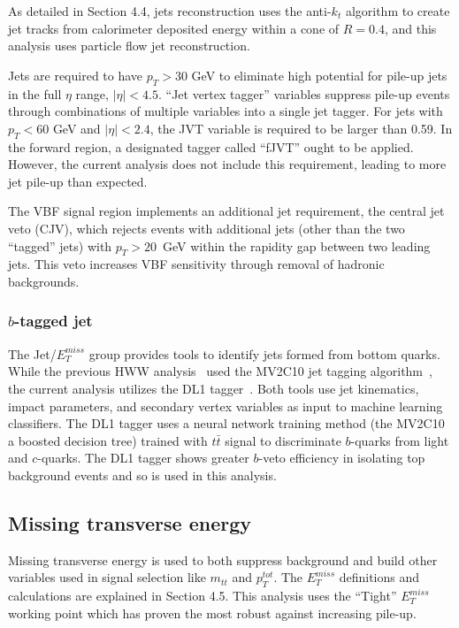 As detailed in Section 4.4, jets reconstruction uses the anti-$k_t$ algorithm to create jet tracks from calorimeter deposited energy within a cone of $R = 0.4$, and this analysis uses particle flow jet reconstruction.   

Jets are required to have $p_T > 30$ GeV to eliminate high potential for pile-up jets in the full $\eta$ range, $|\eta| < 4.5$. ``Jet vertex tagger'' variables suppress pile-up events through combinations of multiple variables into a single jet tagger. For jets with $p_T < 60$ GeV and $|\eta| < 2.4$, the JVT variable is required to be larger than 0.59. In the forward region, a designated tagger called ``fJVT'' ought to be applied. However, the current analysis does not include this requirement, leading to more jet pile-up than expected. 

The VBF signal region implements an additional jet requirement, the central jet veto (CJV), which rejects events with additional jets (other than the two ``tagged'' jets) with $p_T>20$~GeV within the rapidity gap between two leading jets. This veto increases VBF sensitivity through removal of hadronic backgrounds.
\subsubsection{$b$-tagged jet}

The Jet/$E_T^{miss}$ group provides tools to identify jets formed from bottom quarks. While the previous HWW analysis~\cite{Aaboud_2019} used the MV2C10 jet tagging algorithm~\cite{MV2C10}, the current analysis utilizes the DL1 tagger~\cite{DL1}. Both tools use jet kinematics, impact parameters, and secondary vertex variables as input to machine learning classifiers. The DL1 tagger uses a neural network training method (the MV2C10 a boosted decision tree) trained with $t\bar{t}$ signal to discriminate $b$-quarks from light and $c$-quarks. The DL1 tagger shows greater $b$-veto efficiency in isolating top background events and so is used in this analysis. 

\subsection{Missing transverse energy}

Missing transverse energy is used to both suppress background and build other variables used in signal selection like $m_{tt}$ and $p_T^{tot}$. The $E_T^{miss}$ definitions and calculations are explained in Section 4.5. This analysis uses the ``Tight'' $E_T^{miss}$ working point which has proven the most robust against increasing pile-up.

